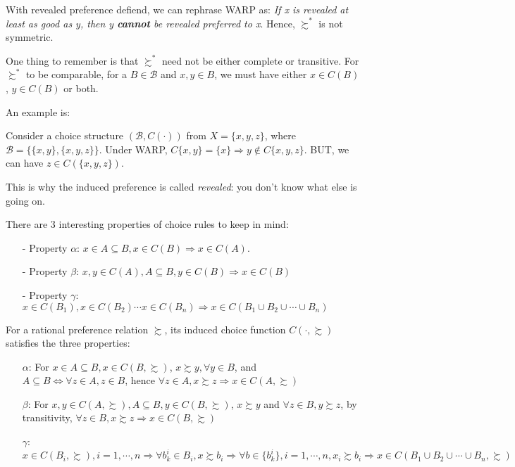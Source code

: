 With revealed preference defiend, we can rephrase WARP as: \textit{If x is revealed at least as good as y, then y \textbf{cannot} be revealed preferred to x}. Hence, $\succsim^*$ is not symmetric.

One thing to remember is that $\succsim^*$ need not be either complete or transitive. For $\succsim^*$ to be comparable, for a $B\in\mathcal{B}$ and $x,y\in B$, we must have either $x\in C(B)$, $y\in C(B)$ or both.

An example is:
\begin{example}
    Consider a choice structure $(\mathcal{B},C(\cdot))$ from $X=\{x,y,z\}$, where $\mathcal{B}=\{\{x,y\},\{x,y,z\}\}$. Under WARP, $C\{x,y\}=\{x\}\Rightarrow y\notin C\{x,y,z\}$.
    BUT, we can have $z\in C(\{x,y,z\})$.
\end{example}

This is why the induced preference is called \textit{revealed}: you don't know what else is going on.

There are 3 interesting properties of choice rules to keep in mind:
\begin{enumerate}
    \item[-] Property $\alpha$: $x\in A \subseteq B,x\in C(B)\Rightarrow x\in C(A)$.
    \item[-] Property $\beta$: $x,y\in C(A), A\subseteq B, y\in C(B)\Rightarrow x\in C(B)$
    \item[-] Property $\gamma$: $x\in C(B_1),x\in C(B_2) \cdots x\in C(B_n)\Rightarrow x\in C(B_1\cup B_2\cup\cdots\cup B_n)$
\end{enumerate}

For a rational preference relation $\succsim$, its induced choice function $C(\cdot,\succsim)$ satisfies the three properties:
\begin{enumerate}
    \item[$\alpha$:] For $x\in A \subseteq B,x\in C(B,\succsim)$, $x\succsim y, \forall y\in B$, and $A\subseteq B\Leftrightarrow \forall z\in A,z\in B$, hence $\forall z\in A,x\succsim z\Rightarrow x\in C(A,\succsim)$
    \item[$\beta$:] For $x,y\in C(A,\succsim), A\subseteq B, y\in C(B,\succsim)$, $x\succsim y$ and $\forall z\in B,y\succsim z$, by transitivity, $\forall z\in B, x\succsim z\Rightarrow x\in C(B,\succsim)$
    \item[$\gamma$:] $x\in C(B_i,\succsim),i=1,\cdots,n\Rightarrow \forall b^i_k \in B_i, x\succsim b_i\Rightarrow \forall b\in \{b^i_k\}, i=1,\cdots,n, x_i\succsim b_i\Rightarrow x\in C(B_1\cup B_2\cup\cdots\cup B_n,\succsim)$
\end{enumerate}

